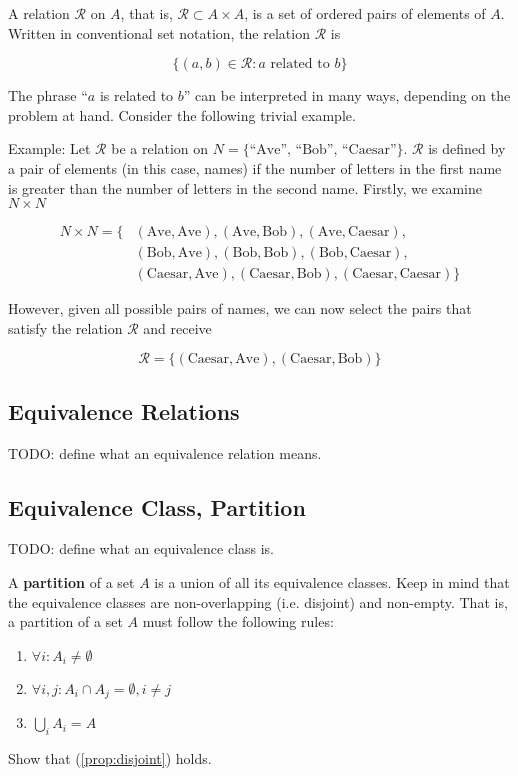 \newcommand{\rel}{\mathcal{R}}

A relation $\rel$ on $A$, that is, \(\rel \subset A \times A\), is a set of
ordered pairs of elements of $A$. Written in conventional set notation, the
relation $\rel$ is

\[
  \{(a, b) \in \rel: a \text{ related to } b\}
\]

The phrase ``$a$ is related to $b$'' can be interpreted in many ways, depending
on the problem at hand. Consider the following trivial example.

Example: Let $\rel$ be a relation on \(N = \{\text{``Ave'', ``Bob'',
``Caesar''}\}\). $\rel$ is defined by a pair of elements (in this case, names)
if the number of letters in the first name is greater than the number of
letters in the second name. Firstly, we examine \(N \times N\)

\begin{align*}
  N \times N = \{&(\text{Ave}, \text{Ave}), (\text{Ave}, \text{Bob}), (\text{Ave}, \text{Caesar}),\\
                 &(\text{Bob}, \text{Ave}), (\text{Bob}, \text{Bob}),
                 (\text{Bob}, \text{Caesar}),\\
                 &(\text{Caesar}, \text{Ave}), (\text{Caesar}, \text{Bob}),
                  (\text{Caesar}, \text{Caesar})\}
\end{align*}

However, given all possible pairs of names, we can now select the pairs that
satisfy the relation $\rel$ and receive

\[
  \rel = \{(\text{Caesar}, \text{Ave}), (\text{Caesar}, \text{Bob})\}
\]

\subsection{Equivalence Relations}

TODO: define what an equivalence relation means.

\subsection{Equivalence Class, Partition}

TODO: define what an equivalence class is.

A \textbf{partition} of a set $A$ is a union of all its equivalence classes. Keep
in mind that the equivalence classes are non-overlapping (i.e. disjoint) and
non-empty. That is, a partition of a set $A$ must follow the following rules:

\begin{enumerate}
  \item \(\forall i: A_i \neq \emptyset\)
  \item \(\forall i, j: A_i \cap A_j = \emptyset, i \neq j\) \label{prop:disjoint}
  \item \(\bigcup_{i} A_i = A\)
\end{enumerate}

\exercise Show that (\ref{prop:disjoint}) holds.
